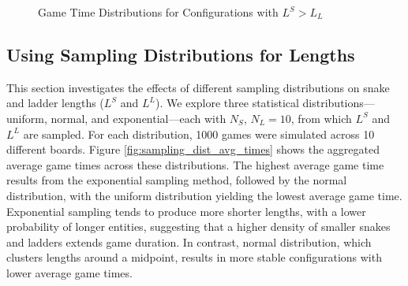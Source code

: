 \begin{figure}[ht]
	\centering
	\linebreak
	\caption{Game Time Distributions for Configurations with $L^S > L_L$}
	\label{fig:fixed_lengths_dist}
\end{figure}


\subsection{Using Sampling Distributions for Lengths}

This section investigates the effects of different sampling distributions on snake and ladder lengths ($L^S$ and $L^L$). We explore three statistical distributions—uniform, normal, and exponential—each with $N_S$, $N_L = 10$, from which $L^S$ and $L^L$ are sampled. For each distribution, 1000 games were simulated across 10 different boards. Figure \ref{fig:sampling_dist_avg_times} shows the aggregated average game times across these distributions. The highest average game time results from the exponential sampling method, followed by the normal distribution, with the uniform distribution yielding the lowest average game time. Exponential sampling tends to produce more shorter lengths, with a lower probability of longer entities, suggesting that a higher density of smaller snakes and ladders extends game duration. In contrast, normal distribution, which clusters lengths around a midpoint, results in more stable configurations with lower average game times.

